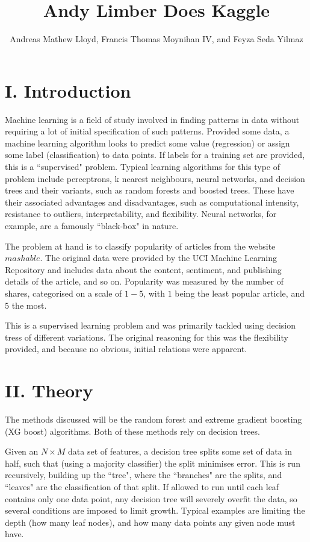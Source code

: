 \documentclass[onecolumn,prl,aps,10pt]{revtex4}
\begin{document}
\title{Andy Limber Does Kaggle}
\author{Andreas Mathew Lloyd, Francis Thomas Moynihan IV, and Feyza Seda Yilmaz}
\maketitle

\section{I. Introduction}
Machine learning is a field of study involved in finding patterns in data without requiring a lot of initial specification of such patterns. Provided some data, a machine learning algorithm looks to predict some value (regression) or assign some label (classification) to data points. If labels for a training set are provided, this is a \textquotedblleft supervised" problem. Typical learning algorithms for this type of problem include perceptrons, k nearest neighbours, neural networks, and decision trees and their variants, such as random forests and boosted trees. These have their associated advantages and disadvantages, such as computational intensity, resistance to outliers, interpretability, and flexibility. Neural networks, for example, are a famously \textquotedblleft black-box" in nature.

The problem at hand is to classify popularity of articles from the website $mashable$. The original data were provided by the UCI Machine Learning Repository and includes data about the content, sentiment, and publishing details of the article, and so on. Popularity was measured by the number of shares, categorised on a scale of $1 - 5$, with $1$ being the least popular article, and $5$ the most.

This is a supervised learning problem and was primarily tackled using decision tress of different variations. The original reasoning for this was the flexibility provided, and because no obvious, initial relations were apparent.

\section{II. Theory}
The methods discussed will be the random forest and extreme gradient boosting (XG boost) algorithms. Both of these methods rely on decision trees. 

Given an $N \times M$ data set of features, a decision tree splits some set of data in half, such that (using a majority classifier) the split minimises error. This is run recursively, building up the \textquotedblleft tree", where the \textquotedblleft branches" are the splits, and \textquotedblleft leaves" are the classification of that split. If allowed to run until each leaf contains only one data point, any decision tree will severely overfit the data, so several conditions are imposed to limit growth. Typical examples are limiting the depth (how many leaf nodes), and how many data points any given node must have. 
\end{document}
